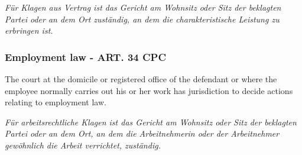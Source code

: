 \textit{Für Klagen aus Vertrag ist das Gericht am Wohnsitz oder Sitz der beklagten Partei oder an dem Ort zuständig, an dem die charakteristische Leistung zu erbringen ist.}

\subsubsection{Employment law - ART. 34 CPC}
The court at the domicile or registered office of the defendant or where the employee normally carries out his or her work has jurisdiction to decide actions relating to employment law.

\textit{Für arbeitsrechtliche Klagen ist das Gericht am Wohnsitz oder Sitz der beklagten Partei oder an dem Ort, an dem die Arbeitnehmerin oder der Arbeitnehmer gewöhnlich die Arbeit verrichtet, zuständig.}